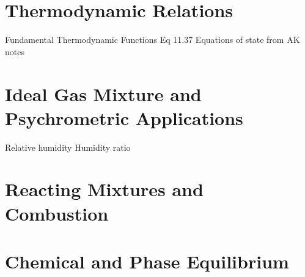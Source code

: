 \documentclass[paper=letter, fontsize=11pt]{scrartcl}
\numberwithin{equation}{section}        %
\numberwithin{figure}{section}          %
\numberwithin{table}{section}               %
\begin{document}
\section{Thermodynamic Relations}
    Fundamental Thermodynamic Functions Eq 11.37
    Equations of state from AK notes

\section{Ideal Gas Mixture and Psychrometric Applications}
    Relative humidity
    Humidity ratio

\section{Reacting Mixtures and Combustion}

\section{Chemical and Phase Equilibrium}

\end{document}
